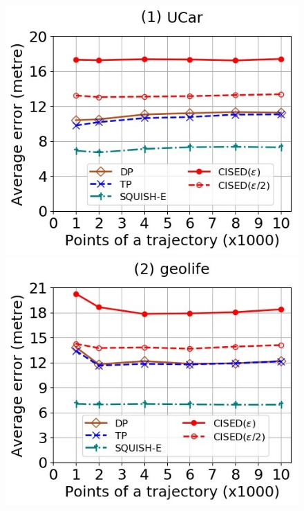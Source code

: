 \begin{figure}[tb!]
	\centering
	\includegraphics[scale=0.400]{Figures/Exp-when-SED-error-size-service.jpg} 	\hspace{2ex}
	\includegraphics[scale=0.400]{Figures/Exp-when-SED-error-size-geolife.jpg}	\hspace{2ex}

\end{figure}
